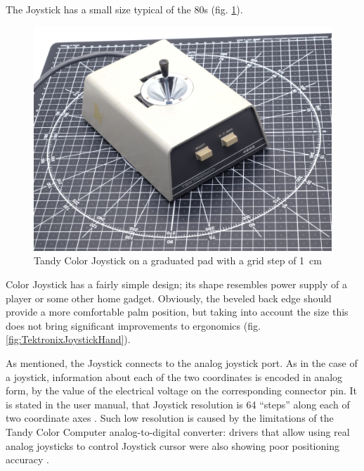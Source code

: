 \documentclass[11pt, a4paper]{article}
\begin{document}
The Joystick has a small size typical of the 80s (fig. \ref{fig:TektronixJoystickSize}).

\begin{figure}[h]
    \centering
    \includegraphics[scale=0.49]{1975_Tektronix_4952_Joystick/size_30.jpg}
    \caption{Tandy Color Joystick on a graduated pad with a grid step of 1~cm}
    \label{fig:TektronixJoystickSize}
\end{figure}

Color Joystick has a fairly simple design; its shape resembles power supply of a player or some other home gadget. Obviously, the beveled back edge should provide a more comfortable palm position, but taking into account the size this does not bring significant improvements to ergonomics (fig. \ref{fig:TektronixJoystickHand}).

As mentioned, the Joystick connects to the analog joystick port. As in the case of a joystick, information about each of the two coordinates is encoded in analog form, by the value of the electrical voltage on the corresponding connector pin. It is stated in the user manual, that Joystick resolution is 64 ``steps'' along each of two coordinate axes \cite{manual}. Such low resolution is caused by the limitations of the Tandy Color Computer analog-to-digital converter: drivers that allow using real analog joysticks to control Joystick cursor were also showing poor positioning accuracy \cite{hierophant}.
\end{document}
